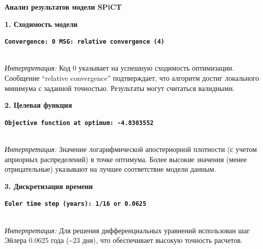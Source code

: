 \documentclass[
  letterpaper,
  DIV=11,
  numbers=noendperiod]{scrreprt}
\newenvironment{Shaded}{\begin{snugshade}}{\end{snugshade}}
\newcommand{\ConstantTok}[1]{\textcolor[rgb]{0.56,0.35,0.01}{#1}}
\newcommand{\DecValTok}[1]{\textcolor[rgb]{0.68,0.00,0.00}{#1}}
\newcommand{\FloatTok}[1]{\textcolor[rgb]{0.68,0.00,0.00}{#1}}
\newcommand{\FunctionTok}[1]{\textcolor[rgb]{0.28,0.35,0.67}{#1}}
\newcommand{\NormalTok}[1]{\textcolor[rgb]{0.00,0.23,0.31}{#1}}
\newcommand{\SpecialCharTok}[1]{\textcolor[rgb]{0.37,0.37,0.37}{#1}}
\begin{document}
\begin{Shaded}
\end{Shaded}

\textbf{Анализ результатов модели SPiCT}

\textbf{1. Сходимость модели}

\textbf{\texttt{Convergence:\ 0\ MSG:\ relative\ convergence\ (4)}}\strut \\
\emph{Интерпретация:} Код 0 указывает на успешную сходимость
оптимизации. Сообщение ``relative convergence'' подтверждает, что
алгоритм достиг локального минимума с заданной точностью. Результаты
могут считаться валидными.

\textbf{2. Целевая функция}

\textbf{\texttt{Objective\ function\ at\ optimum:\ -4.8303552}}\strut \\
\emph{Интерпретация:} Значение логарифмической апостериорной плотности
(с учетом априорных распределений) в точке оптимума. Более высокие
значения (менее отрицательные) указывают на лучшее соответствие модели
данным.

\textbf{3. Дискретизация времени}

\textbf{\texttt{Euler\ time\ step\ (years):\ 1/16\ or\ 0.0625}}\strut \\
\emph{Интерпретация:} Для решения дифференциальных уравнений использован
шаг Эйлера 0.0625 года (\textasciitilde23 дня), что обеспечивает высокую
точность расчетов.
\end{document}
